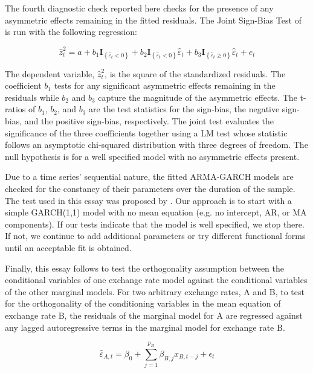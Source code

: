 The fourth diagnostic check reported here checks for the presence of any asymmetric effects remaining in the fitted residuals. The Joint Sign-Bias Test of \cite{Engle_Ng_1993} is run with the following regression:

\begin{equation}
	\hat{z}_{t}^{2} = a + b_{1} \mathbf{I}_{\left\{\hat{\varepsilon}_{t} < 0 \right\}} + b_{2} \mathbf{I}_{\left\{\hat{\varepsilon}_{t} < 0 \right\}} \hat{\varepsilon}_{t} + b_{3} \mathbf{I}_{\left\{\hat{\varepsilon}_{t} \geq 0 \right\}} \hat{\varepsilon}_{t} + e_{t}
\end{equation}

The dependent variable, $\hat{z}_{t}^{2}$, is the square of the standardized residuals. The coefficient $b_{1}$ tests for any significant asymmetric effects remaining in the residuals while $b_{2}$ and $b_{3}$ capture the magnitude of the asymmetric effects. The t-ratios of $b_{1}$, $b_{2}$, and $b_{3}$ are the test statistics for the sign-bias, the negative sign-bias, and the positive sign-bias, respectively. The joint test evaluates the significance of the three coefficients together using a LM test whose statistic follows an asymptotic chi-squared distribution with three degrees of freedom. The null hypothesis is for a well specified model with no asymmetric effects present.

Due to a time series' sequential nature, the fitted ARMA-GARCH models are checked for the constancy of their parameters over the duration of the sample. The test used in this essay was proposed by \cite{NYBLOM_1989}. Our approach is to start with a simple GARCH(1,1) model with no mean equation (e.g. no intercept, AR, or MA components). If our tests indicate that the model is well specified, we stop there. If not, we continue to add additional parameters or try different functional forms until an acceptable fit is obtained.

Finally, this essay follows \cite{Patton_2006} to test the orthogonality assumption between the conditional variables of one exchange rate model against the conditional variables of the other marginal models. For two arbitrary exchange rates, A and B, to test for the orthogonality of the conditioning variables in the mean equation of exchange rate B, the residuals of the marginal model for A are regressed against any lagged autoregressive terms in the marginal model for exchange rate B.

\begin{equation} \label{eq:mean_orthogonality_assumption}
	\hat{\varepsilon}_{A, t} = \beta_{0} + \sum_{j=1}^{p_{B}}\beta_{B,j} x_{B, t-j} + \epsilon_{t}
\end{equation}

